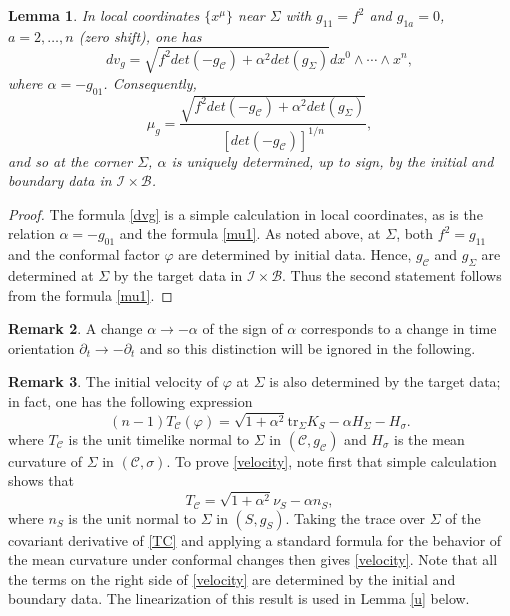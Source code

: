 \documentclass[10pt]{amsart}
\renewcommand{\a}{\alpha}
\newcommand{\f}{\varphi}
\newcommand{\s}{\sigma}
\newcommand{\Si}{\Sigma}
\newcommand{\cC}{{\mathcal C}}
\newcommand{\cB}{{\mathcal B}}
\newcommand{\cI}{\mathcal I}
\newcommand{\be}{\begin{equation}}
\newcommand{\ee}{\end{equation}}
\newcommand{\tr}{\mathrm{tr}}
\newcommand{\p}{\partial}
\renewcommand{\to}{\rightarrow}
\newcommand{\<}{\langle}
\renewcommand{\>}{\rangle}
\theoremstyle{plain}
\newtheorem{lemma}{Lemma}[section]
\theoremstyle{remark}
\theoremstyle{definition}
\newtheorem{remark}[lemma]{Remark}
\numberwithin{equation}{section}
\begin{document}
\begin{lemma} \label{corner}
In local coordinates $\{x^{\mu}\}$ near $\Si$ with $g_{11} = f^2$ and $g_{1a} = 0$, $a = 2, \dots, n$ (zero shift), one has 
\be \label{dvg}
dv_g = \sqrt{f^2 det(-g_{\cC}) + \a^2 det(g_{\Si})} dx^0 \wedge \cdots \wedge x^n,
\ee
where $\a = -g_{01}$. Consequently, 
\be \label{mu1}
\mu_g = \frac{\sqrt{f^2 det(-g_{\cC}) + \a^2 det(g_{\Si})}}{[det(-g_{\cC})]^{1/n}},
\ee
and so at the corner $\Si$, $\a$ is uniquely determined, up to sign, by the initial and boundary data in $\cI \times \cB$. 

\end{lemma}

\begin{proof}
The formula \eqref{dvg} is a simple calculation in local coordinates, as is the relation $\a = -g_{01}$ and the formula \eqref{mu1}. As noted above, 
at $\Si$, both $f^2 = g_{11}$ and the conformal factor $\f$ are determined by initial data. Hence, $g_{\cC}$ and $g_{\Si}$ are determined at 
$\Si$ by the target data in $\cI \times \cB$. Thus the second statement follows from the formula \eqref{mu1}. 
\end{proof}

\begin{remark}
{\rm  A change $\a \to -\a$ of the sign of $\a$ corresponds to a change in time orientation $\p_t \to -\p_t$ and so this distinction will be 
ignored in the following. 
}
\end{remark} 


\begin{remark} \label{vel}
{\rm The initial velocity of $\f$ at $\Si$ is also determined by the target data; in fact, one has the following expression  
\be \label{velocity}
(n-1)T_{\cC}(\f) = \sqrt{1+\a^2}\tr_\Si K_S - \a H_\Si - H_\s.
\ee 
where $T_{\cC}$ is the unit timelike normal to $\Si$ in $(\cC, g_{\cC})$ and $H_{\s}$ is the mean curvature of $\Si$ in $(\cC, \s)$. To prove 
\eqref{velocity}, note first that simple calculation shows that 
\be \label{TC}
T_{\cC} = \sqrt{1+\a^2} \nu_S - \a n_S,
\ee
where $n_S$ is the unit normal to $\Si$ in $(S, g_S)$. Taking the trace over $\Si$ of the covariant derivative of \eqref{TC} and applying a standard 
formula for the behavior of the mean curvature under conformal changes then gives \eqref{velocity}. Note that all the terms on the right side of \eqref{velocity} 
are determined by the initial and boundary data. The linearization of this result is used in Lemma \ref{u} below. 
}
\end{remark}
\end{document}
